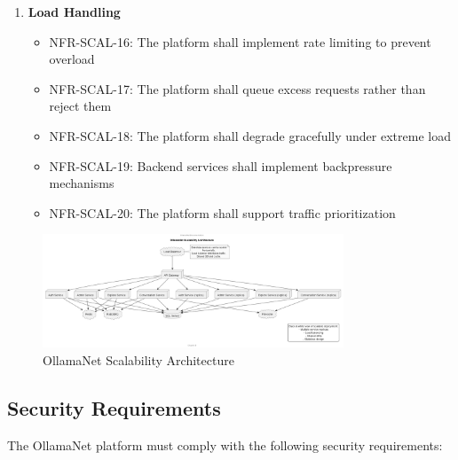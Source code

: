 \begin{enumerate}
   \item \textbf{Load Handling}
   \begin{itemize}
      \item NFR-SCAL-16: The platform shall implement rate limiting to prevent overload
      \item NFR-SCAL-17: The platform shall queue excess requests rather than reject them
      \item NFR-SCAL-18: The platform shall degrade gracefully under extreme load
      \item NFR-SCAL-19: Backend services shall implement backpressure mechanisms
      \item NFR-SCAL-20: The platform shall support traffic prioritization
   \end{itemize}
\end{enumerate}

\begin{figure}
    \centering
    \includegraphics[width=0.8\textwidth]{./Chapter03/figures/Scalability_Architecture.png}
    \caption{OllamaNet Scalability Architecture}
    \label{fig:scalability-architecture}
\end{figure}

\subsection{Security Requirements}

The OllamaNet platform must comply with the following security requirements:

